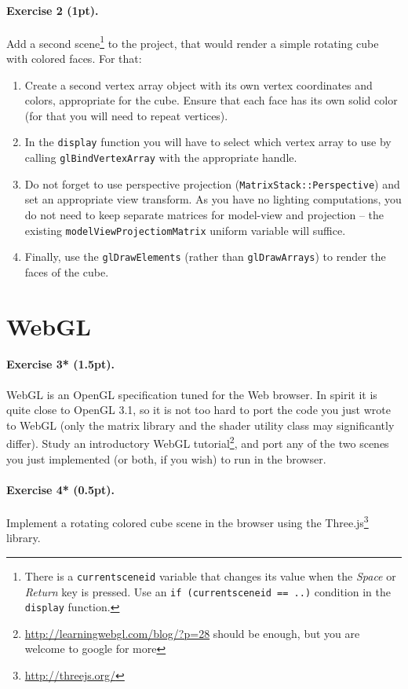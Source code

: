 \documentclass{article}
\newenvironment{exercise}[2]{\paragraph{Exercise #1 (#2pt).} }{
\medskip}
\begin{document}
\begin{exercise}{2}{1}
Add a second scene\footnote{There is a \texttt{current\textunderscore scene\textunderscore id} variable that changes its value when the \emph{Space} or \emph{Return} key is pressed. Use an \texttt{if (current\textunderscore scene\textunderscore id == ..)} condition in the \texttt{display} function.} to the project, that would render a simple rotating cube with colored faces. For that:
\begin{enumerate}
\item Create a second vertex array object with its own vertex coordinates and colors, appropriate for the cube. Ensure that each face has its own solid color (for that you will need to repeat vertices).
\item In the \texttt{display} function you will have to select which vertex array to use by calling \texttt{glBindVertexArray} with the appropriate handle.
\item Do not forget to use perspective projection (\texttt{MatrixStack::Perspective}) and set an appropriate view transform. As you have no lighting computations, you do not need to keep separate matrices for model-view and projection -- the existing \texttt{modelViewProjectiomMatrix} uniform variable will suffice.
\item Finally, use the \verb#glDrawElements# (rather than \texttt{glDrawArrays}) to render the faces of the cube.
\end{enumerate}
\end{exercise}

\section{WebGL}
\begin{exercise}{3*}{1.5}
WebGL is an OpenGL specification tuned for the Web browser. In spirit it is quite close to OpenGL 3.1, so it is not too hard to port the code you just wrote to WebGL (only the matrix library and the shader utility class may significantly differ). Study an introductory WebGL tutorial\footnote{\url{http://learningwebgl.com/blog/?p=28} should be enough, but you are welcome to google for more}, and port any of the two scenes you just implemented (or both, if you wish) to run in the browser.
\end{exercise}

\begin{exercise}{4*}{0.5}
Implement a rotating colored cube scene in the browser using the Three.js\footnote{\url{http://threejs.org/}} library.
\end{exercise}
\end{document}
